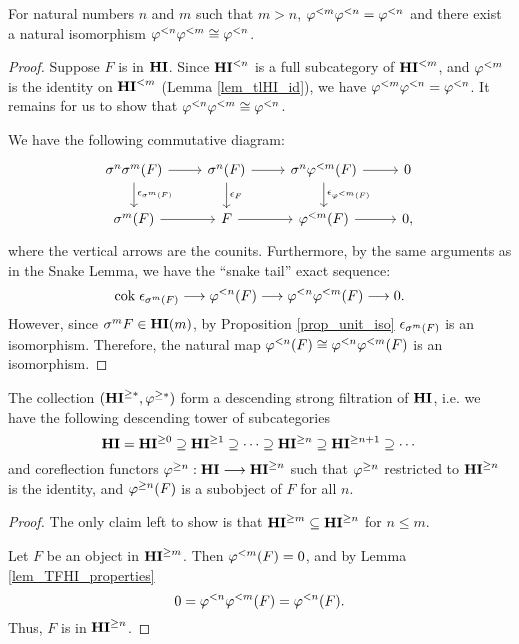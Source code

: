 \begin{lem}\label{lem_TFHI_properties}
For natural numbers $n$ and $m$ such that $m > n$, $\tlHI{m} 
\tlHI{n} = \tlHI{n}$ and there exist a
natural isomorphism $\tlHI{n}\tlHI{m} \cong \tlHI{n}$. 
\end{lem}
\begin{proof}
Suppose $F$ is in $\HI$. Since $\TFHI{n}$ is a
full subcategory of $\TFHI{m}$, and $\tlHI{m}$ is the identity on 
$\TFHI{m}$ (Lemma \ref{lem_tlHI_id}), we have $\tlHI{m}\tlHI{n} = 
\tlHI{n}$. It remains for us to show that $\tlHI{n}\tlHI{m} \cong
\tlHI{n}$.

We have the following commutative diagram:
\begin{equation}\label{eq_sg_nat_diag}
\begin{tikzcd}
\sgHI{n}\sgHI{m}(F) \arrow{r}\arrow{d}{\cuHI_{\sgHI{m}(F)}} &
\sgHI{n}(F) \arrow{r}\arrow{d}{\cuHI_F} &
\sgHI{n}\tlHI{m}(F) \arrow{r}\arrow{d}{\cuHI_{\tlHI{m}(F)}} &
0 \\
\sgHI{m}(F) \arrow{r} &
F \arrow{r} &
\tlHI{m}(F) \arrow{r}&
0,
\end{tikzcd}
\end{equation}
where the vertical arrows are the counits. Furthermore, by the 
same arguments as in the Snake Lemma, we have the ``snake tail'' 
exact sequence:
\[
\cok \cuHI_{\sgHI{m}(F)} \to \tlHI{n}(F) \to \tlHI{n}\tlHI{m}(F) 
   \to 0.
\]
However, since $\sgHI{m}F \in \LHI[m]{\HI}$, by Proposition
\ref{prop_unit_iso} $\cuHI_{\sgHI{m}(F)}$ is an isomorphism.
Therefore, the natural map $\tlHI{n}(F) \cong \tlHI{n}\tlHI{m}(F)$ is
an isomorphism.
\end{proof}

\begin{prop}\label{prop_THI_form_strong_filt}
The collection $(\THI{*}, \tgHI{*})$ form a descending strong 
filtration of $\HI$, i.e. we have the following descending
tower of subcategories
\[
\HI = \THI{0} \supseteq \THI{1} \supseteq \cdots \supseteq \THI{n} \supseteq \THI{n + 1}
\supseteq \cdots
\]
and coreflection functors $\tgHI{n} : \HI \to \THI{n}$ such
that $\tgHI{n}$ restricted to $\THI{n}$ is the identity, and
$\tgHI{n}(F)$ is a subobject of $F$ for all $n$.
\end{prop}
\begin{proof}
The only claim left to show is that $\THI{m} \subseteq \THI{n}$
for $n \leq m$.

Let $F$ be an object in $\THI{m}$. Then 
$\tlHI{m}(F) = 0$, and by Lemma \ref{lem_TFHI_properties}
\[
0 = \tlHI{n}\tlHI{m}(F) = \tlHI{n}(F).
\]
Thus, $F$ is in $\THI{n}$.
\end{proof}

